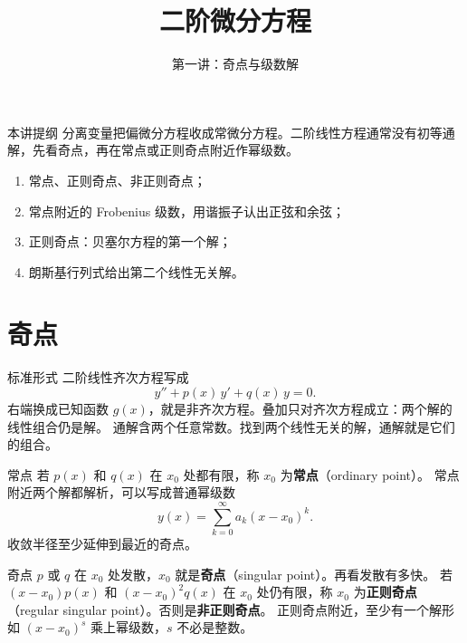 \documentclass[fontset=windows, chinese, 10pt, xcolor=dvipsnames]{beamer}
\title{二阶微分方程}
\subtitle{第一讲：奇点与级数解}
\begin{document}
\begin{frame}
  \titlepage
\end{frame}

\begin{frame}{本讲提纲}
  分离变量把偏微分方程收成常微分方程。二阶线性方程通常没有初等通解，先看奇点，再在常点或正则奇点附近作幂级数。
  \begin{enumerate}
    \item 常点、正则奇点、非正则奇点；
    \item 常点附近的 Frobenius 级数，用谐振子认出正弦和余弦；
    \item 正则奇点：贝塞尔方程的第一个解；
    \item 朗斯基行列式给出第二个线性无关解。
  \end{enumerate}
\end{frame}

\section{奇点}

\begin{frame}{标准形式}
  二阶线性齐次方程写成
  \begin{equation*}
    y''+p(x)\,y'+q(x)\,y=0.
  \end{equation*}
  右端换成已知函数 $g(x)$，就是非齐次方程。叠加只对齐次方程成立：两个解的线性组合仍是解。
  \vspace{0.4em}
  通解含两个任意常数。找到两个线性无关的解，通解就是它们的组合。
\end{frame}

\begin{frame}{常点}
  若 $p(x)$ 和 $q(x)$ 在 $x_0$ 处都有限，称 $x_0$ 为\textbf{常点}（ordinary point）。
  \vspace{0.45em}
  常点附近两个解都解析，可以写成普通幂级数
  \begin{equation*}
    y(x)=\sum_{k=0}^{\infty}a_k(x-x_0)^k.
  \end{equation*}
  收敛半径至少延伸到最近的奇点。
\end{frame}

\begin{frame}{奇点}
  $p$ 或 $q$ 在 $x_0$ 处发散，$x_0$ 就是\textbf{奇点}（singular point）。再看发散有多快。
  \vspace{0.35em}
  若 $(x-x_0)p(x)$ 和 $(x-x_0)^2 q(x)$ 在 $x_0$ 处仍有限，称 $x_0$ 为\textbf{正则奇点}（regular singular point）。否则是\textbf{非正则奇点}。
  \vspace{0.35em}
  正则奇点附近，至少有一个解形如 $(x-x_0)^s$ 乘上幂级数，$s$ 不必是整数。
\end{frame}
\end{document}
